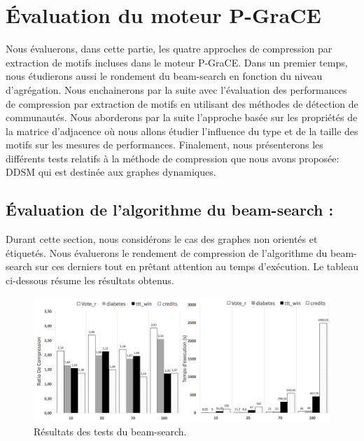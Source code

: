 	\section{Évaluation du moteur P-GraCE}
	
	Nous évaluerons, dans cette partie, les quatre approches de compression par extraction de motifs incluses dans le moteur P-GraCE. 
	Dans un premier temps, nous étudierons aussi le rondement du beam-search en fonction du niveau d'agrégation.  Nous enchainerons par la suite avec l'évaluation des performances de compression par extraction de motifs en utilisant des méthodes de détection de communautés. Nous aborderons par la suite l'approche basée sur les propriétés de la matrice d'adjacence où nous allons étudier l'influence du type et de la taille des motifs sur les mesures de performances.
	Finalement, nous présenterons les différents tests relatifs à la méthode de compression que nous avons proposée: DDSM qui est destinée aux graphes dynamiques.
	\subsection{Évaluation de l'algorithme du beam-search :}
	
  Durant cette section, nous considérons le cas des graphes non orientés et étiquetés. Nous évaluerons le rendement de compression de l'algorithme du beam-search sur ces derniers tout en prêtant attention au temps d'exécution. Le tableau ci-dessous résume les résultats obtenus.
  

	\begin{figure}[H]
	
			
			\includegraphics[scale=0.37]{ressources/image/beam.png}
			
			\caption{Résultats des tests du beam-search.}
			\label{fig:test-beam}
	
	\end{figure}
	
	
